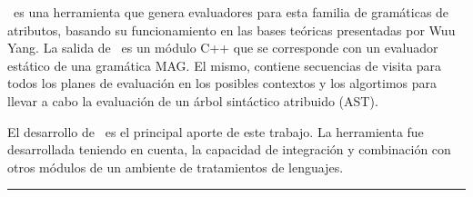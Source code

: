 \documentclass[a4paper,12pt,twoside]{ThesisStyle}
\begin{document}
\begin{vcenterpage}
\maggen\ es una herramienta que genera evaluadores para esta familia de gramáticas de atributos, basando su funcionamiento en las bases teóricas presentadas por Wuu Yang. La salida de \maggen\ es un módulo C++ que se corresponde con un evaluador estático de una gramática MAG. El mismo, contiene secuencias de visita para todos los planes de evaluación en los posibles contextos y los algortimos para llevar a cabo la evaluación de un árbol sintáctico atribuido (AST).

El desarrollo de \maggen\ es el principal aporte de este trabajo. La herramienta fue desarrollada teniendo en cuenta, la capacidad de integración y combinación con otros módulos de un ambiente de tratamientos de lenguajes.

% 

\noindent\rule[2pt]{\textwidth}{0.5pt}

\end{vcenterpage}

\tableofcontents

\mainmatter

% 
\appendix
\addappheadtotoc
\appendixpage


\listoffigures

\listoftables

\listofalgorithms

% 
% 



\end{document}
